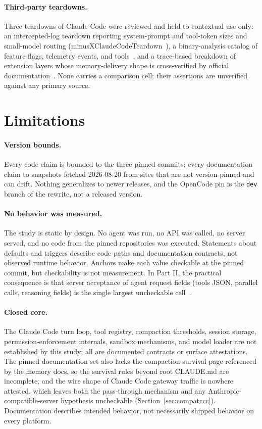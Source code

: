 \documentclass{article}
\newcommand{\occ}[0]{OpenCode}
\newcommand{\ccc}[0]{Claude Code}
\begin{document}
\paragraph{Third-party teardowns.} Three teardowns of \ccc{} were reviewed
and held to contextual use only: an intercepted-log teardown reporting
system-prompt and tool-token sizes and small-model routing
(minusXClaudeCodeTeardown~\citep{minusXClaudeCodeTeardown}), a binary-analysis catalog of
feature flags, telemetry events, and tools~\citep{tenguDecoded}, and a
trace-based breakdown of extension layers whose memory-delivery shape is
cross-verified by official documentation~\citep{agiflowClaudeCodeInternals}. None
carries a comparison cell; their assertions are unverified against any
primary source.

\section{Limitations}
\label{sec:limitations}

\paragraph{Version bounds.} Every code claim is bounded to the three pinned
commits; every documentation claim to snapshots fetched 2026-08-20 from
sites that are not version-pinned and can drift. Nothing generalizes to
newer releases, and the \occ{} pin is the \texttt{dev} branch of the
rewrite, not a released version.

\paragraph{No behavior was measured.} The study is static by design. No
agent was run, no API was called, no server served, and no code from the
pinned repositories was executed. Statements about defaults and triggers
describe code paths and documentation contracts, not observed runtime
behavior. Anchors make each value checkable at the pinned commit, but
checkability is not measurement. In Part II, the practical
consequence is that server acceptance of agent request fields (tools
JSON, parallel calls, reasoning fields) is the single largest uncheckable
cell~\citep{codexRepo,lmstudioApiDocs}.

\paragraph{Closed core.} The \ccc{} turn loop, tool registry, compaction
thresholds, session storage, permission-enforcement internals, sandbox
mechanisms, and model loader are not established by this study; all are
documented contracts or surface attestations. The pinned documentation
set also lacks the compaction-survival page referenced by the memory
docs, so the survival rules beyond root CLAUDE.md are incomplete, and the
wire shape of \ccc{} gateway traffic is nowhere attested, which leaves
both the pass-through mechanism and any Anthropic-compatible-server
hypothesis uncheckable (Section~\ref{sec:compatccc}). Documentation
describes intended behavior, not necessarily shipped behavior on every
platform.
\end{document}
